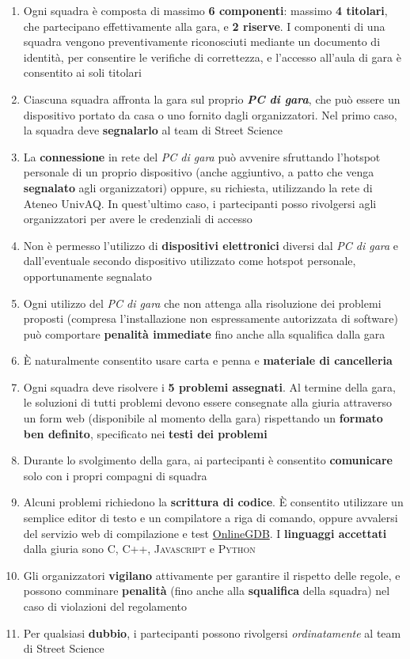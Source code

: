 \documentclass{article}
\begin{document}
\begin{enumerate}
    \item Ogni squadra è composta di massimo \textbf{6 componenti}: massimo \textbf{4 titolari}, che partecipano effettivamente alla gara, e \textbf{2 riserve}. I componenti di una squadra vengono preventivamente riconosciuti mediante un documento di identità, per consentire le verifiche di correttezza, e l'accesso all'aula di gara è consentito ai soli titolari
    \item Ciascuna squadra affronta la gara sul proprio \textbf{\textit{PC di gara}}, che può essere un dispositivo portato da casa o uno fornito dagli organizzatori. Nel primo caso, la squadra deve \textbf{segnalarlo} al team di Street Science
    \item La \textbf{connessione} in rete del \textit{PC di gara} può avvenire sfruttando l'hotspot personale di un proprio dispositivo (anche aggiuntivo, a patto che venga \textbf{segnalato} agli organizzatori) oppure, su richiesta, utilizzando la rete di Ateneo UnivAQ. In quest'ultimo caso, i partecipanti posso rivolgersi agli organizzatori per avere le credenziali di accesso
    \item Non è permesso l'utilizzo di \textbf{dispositivi elettronici} diversi dal \textit{PC di gara} e dall'eventuale secondo dispositivo utilizzato come hotspot personale, opportunamente segnalato
    \item Ogni utilizzo del \textit{PC di gara} che non attenga alla risoluzione dei problemi proposti (compresa l'installazione non espressamente autorizzata di software) può comportare \textbf{penalità immediate} fino anche alla squalifica dalla gara
    \item È naturalmente consentito usare carta e penna e \textbf{materiale di cancelleria}
    \item Ogni squadra deve risolvere i \textbf{5 problemi assegnati}. Al termine della gara, le soluzioni di tutti problemi devono essere consegnate alla giuria attraverso un form web (disponibile al momento della gara) rispettando un \textbf{formato ben definito}, specificato nei \textbf{testi dei problemi}
    \item Durante lo svolgimento della gara, ai partecipanti è consentito \textbf{comunicare} solo con i propri compagni di squadra
    \item Alcuni problemi richiedono la \textbf{scrittura di codice}. È consentito utilizzare un semplice editor di testo e un compilatore a riga di comando, oppure avvalersi del servizio web di compilazione e test \href{www.onlinegdb.com}{OnlineGDB}. I \textbf{linguaggi accettati} dalla giuria sono \textsc{C}, \textsc{C++}, \textsc{Javascript} e \textsc{Python}
    \item Gli organizzatori \textbf{vigilano} attivamente per garantire il rispetto delle regole, e possono comminare \textbf{penalità} (fino anche alla \textbf{squalifica} della squadra) nel caso di violazioni del regolamento
    \item Per qualsiasi \textbf{dubbio}, i partecipanti possono rivolgersi \textit{ordinatamente} al team di Street Science
\end{enumerate}
\end{document}
